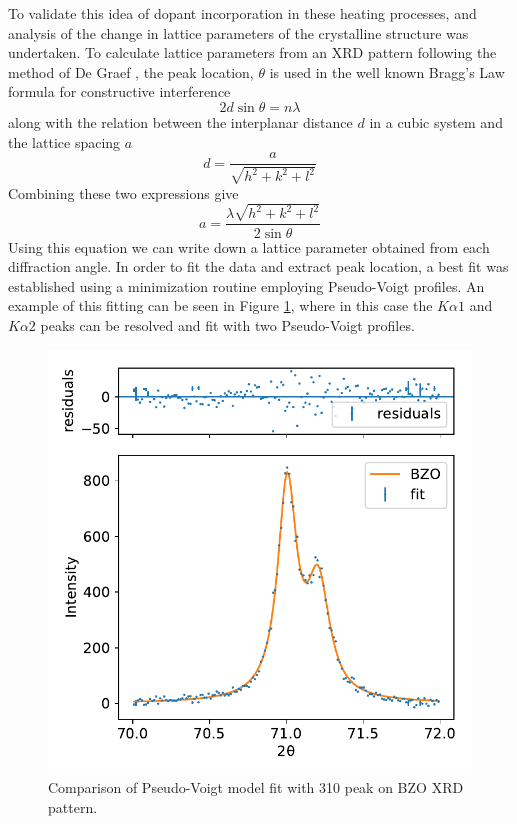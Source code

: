 To validate this idea of dopant incorporation in these heating processes, and analysis of the change in lattice parameters of the crystalline structure was undertaken. To calculate lattice parameters from an XRD pattern following the method of De Graef \cite{DeGraef2007}, the peak location, $\theta$ is used in the well known Bragg's Law formula for constructive interference $$2 d \sin{\theta} = n \lambda$$
along with the relation between the interplanar distance $d$ in a cubic system and the lattice spacing $a$ $$d = \frac{a}{\sqrt{h^2+k^2+l^2}}$$ Combining these two expressions give 
\begin{equation}
    a = \frac{\lambda \sqrt{h^2+k^2+l^2}}{2 \sin{\theta}}
    \label{xrd:latticeParameter}
\end{equation}
Using this equation we can write down a lattice parameter obtained from each diffraction angle. In order to fit the data and extract peak location, a best fit was established using a minimization routine employing Pseudo-Voigt profiles. An example of this fitting can be seen in Figure \ref{fig:target:xrd:fitComparison}, where in this case the $K\alpha1$ and $K\alpha2$ peaks can be resolved and fit with two Pseudo-Voigt profiles. 

\begin{figure}
    \centering
    \includegraphics{Figures/190219-xrd-BZO-model-fit.pdf}
    \caption{Comparison of Pseudo-Voigt model fit with 310 peak on BZO XRD pattern.}
    \label{fig:target:xrd:fitComparison}
\end{figure}

